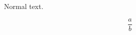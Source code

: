 \documentclass[fleqn]{memoir}
\begin{document}
  Normal text.

  \begin{center}
    \[
    \frac{a}{b}
    \]
  \end{center}
\end{document}
